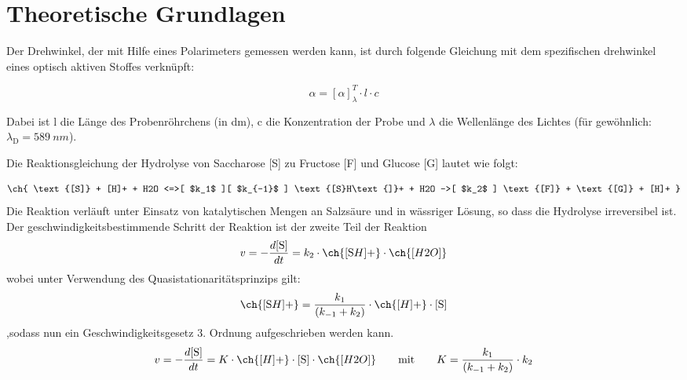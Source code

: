 \setlength\abovedisplayshortskip{20pt}
\setlength\belowdisplayshortskip{20pt}
\setlength\abovedisplayskip{20pt}
\setlength\belowdisplayskip{20pt}

\section{Theoretische Grundlagen \cite{wedler}}


Der Drehwinkel, der mit Hilfe eines Polarimeters gemessen werden kann, ist durch folgende Gleichung mit dem spezifischen drehwinkel eines optisch aktiven Stoffes verknüpft:

\begin{equation}
\alpha=\left[\alpha\right]_\lambda^T \cdot l \cdot c
\label{eq:Drehwinkelallgemein}
\end{equation}

Dabei ist l die Länge des Probenröhrchens (in dm), c die Konzentration der Probe und $\lambda$ die Wellenlänge des Lichtes (für gewöhnlich: $\lambda_\text{D}=589~\si{nm}$).

Die Reaktionsgleichung der Hydrolyse von Saccharose [S] zu Fructose [F] und Glucose [G] lautet wie folgt: 

\begin{equation}
\ch{ \text{[S]} + [H]+ + H2O <=>[ $k_1$ ][ $k_{-1}$ ] \text{[S}H\text{]}+ + H2O ->[ $k_2$ ] \text{[F]} + \text{[G]} + [H]+  }
\label{Hydrolysegleichung}
\end{equation}
Die Reaktion verläuft unter Einsatz von katalytischen Mengen an Salzsäure und in wässriger Lösung, so dass die Hydrolyse irreversibel ist. Der geschwindigkeitsbestimmende Schritt der Reaktion ist der zweite Teil der Reaktion
\begin{align}
v = - \frac{d \text{[S]}}{dt}= k_2 \cdot \ch{\text{[S}H\text{]}+} \cdot \ch{[H2O]}
\label{eq:irreversibler2.Schritt}
\end{align}
wobei unter Verwendung des Quasistationaritätsprinzips gilt:
\begin{align}
\ch{\text{[S}H\text{]}+}=\frac{k_1}{\left(k_{-1} + k_2\right)}
 \cdot \ch{\text{[}H\text{]}+} \cdot \text{[S]}
 \label{eq:quasistationfürSH+}
\end{align}
,sodass nun ein Geschwindigkeitsgesetz 3. Ordnung aufgeschrieben werden kann.
\begin{align}
v = - \frac{d \text{[S]}}{dt}= K \cdot \ch{\text{[}H\text{]}+} \cdot \text{[S]} \cdot \ch{[H2O]}
\quad\quad \text{mit}\quad\quad  K=\frac{k_1}{\left(k_{-1} + k_2\right)}
 \cdot k_2
 \label{eq:Gesetz3.Ordnung}
\end{align}

